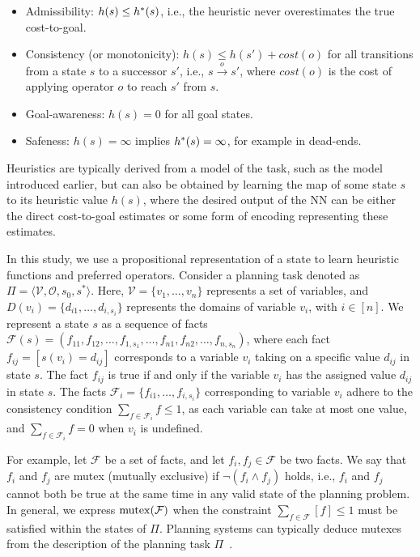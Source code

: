 \documentclass[ppgc,diss,english]{iiufrgs}
\begin{document}
\begin{itemize}
        \item Admissibility: $h(s) \le h^{*}{(s)}$, i.e., the heuristic never overestimates the true cost-to-goal.
        \item Consistency (or monotonicity): $h(s) \le h(s') + cost(o)$ for all transitions from a state $s$ to a successor $s'$, i.e., $s \xrightarrow{o} s'$, where $cost(o)$ is the cost of applying operator $o$ to reach $s'$ from $s$.
        \item Goal-awareness: $h(s) = 0$ for all goal states.
        \item Safeness: $h(s) = \infty$ implies $h^{*} (s) = \infty$, for example in dead-ends.
\end{itemize}

Heuristics are typically derived from a model of the task, such as the \sas model introduced earlier, but can also be obtained by learning the map of some state $s$ to its heuristic value $h(s)$, where the desired output of the NN can be either the direct cost-to-goal estimates or some form of encoding representing these estimates.

In this study, we use a propositional representation of a state to learn heuristic functions and preferred operators. Consider a planning task denoted as $\Pi=\langle\mathcal{V},\mathcal{O},s_0,s^*\rangle$. Here, $\mathcal{V}=\{v_1,\ldots,v_n\}$ represents a set of variables, and $D(v_i)=\{d_{i1},\ldots,d_{i,s_i}\}$ represents the domains of variable $v_i$, with $i\in[n]$. We represent a state $s$ as a sequence of facts
$\mathcal{F}(s)=(f_{11},f_{12},\ldots,f_{1,s_1},\ldots,f_{n1},f_{n2},\ldots,f_{n,s_n})$, where each fact $f_{ij}=[s(v_i)=d_{ij}]$ corresponds to a variable $v_i$ taking on a specific value $d_{ij}$ in state $s$. The fact $f_{ij}$ is true if and only if the variable $v_i$ has the assigned value $d_{ij}$ in state $s$. The facts $\mathcal{F}_i=\{f_{i1},\ldots,f_{i,s_i}\}$ corresponding to variable $v_i$ adhere to the consistency condition $\sum_{f\in \mathcal{F}_i} f\leq 1$, as each variable can take at most one value, and $\sum_{f\in \mathcal{F}_i} f=0$ when $v_i$ is undefined.

For example, let $\mathcal{F}$ be a set of facts, and let $f_i, f_j \in \mathcal{F}$ be two facts. We say that $f_i$ and $f_j$ are mutex (mutually exclusive) if $\neg(f_i \land f_j)$ holds, i.e., $f_i$ and $f_j$ cannot both be true at the same time in any valid state of the planning problem. In general, we express $\operatorname{mutex}(\mathcal{F})$ when the constraint $\sum_{f\in \mathcal{F}} [f]\leq 1$ must be satisfied within the states of $\Pi$. Planning systems can typically deduce mutexes from the description of the planning task $\Pi$~\cite{Helmert/2009}.
\end{document}
